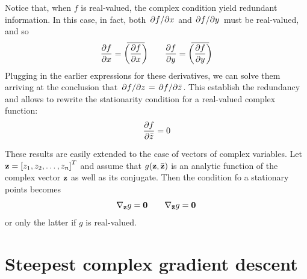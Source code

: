 \documentclass[../main.tex]{subfiles}
\begin{document}
Notice that, when $f$ is real-valued, the complex condition yield redundant information. In this case, in fact, both $\pdv*{f}{x}$ and $\pdv*{f}{y}$ must be real-valued, and so
\[ \pdv{f}{x} = \overbar{\left(\pdv{f}{x}\right)} \qquad \pdv{f}{y} = \overbar{\left(\pdv{f}{y}\right)} \]
Plugging in the earlier expressions for these derivatives, we can solve them arriving at the conclusion that $\pdv*{f}{z} = \pdv*{f}{\bar{z}}$. This establish the redundancy and allows to rewrite the stationarity condition for a real-valued complex function:
\[ \pdv{f}{\bar{z}} = 0 \]

These results are easily extended to the case of vectors of complex variables. Let $\vb{z} = \left[z_1, z_2, \dots, z_n\right]^T$ and assume that $g(\vb{z}, \vb{\bar{z}})$ is an analytic function of the complex vector $\vb{z}$ as well as its conjugate. Then the condition fo a stationary points becomes
\[ \nabla_{\vb{z}}g = \vb{0} \qquad \nabla_{\vb{\bar{z}}}g = \vb{0} \]
or only the latter if $g$ is real-valued.

\section{Steepest complex gradient descent}
\end{document}
